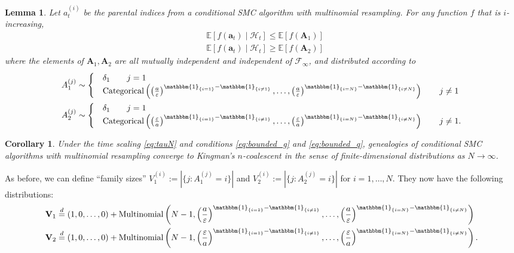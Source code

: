 \documentclass[fleqn]{article}
\newtheorem{lemma}{Lemma}
\newtheorem{corollary}{Corollary}
\theoremstyle{definition}
\newcommand{\E}{\mathbb{E}}
\newcommand{\eqdist}{\overset{d}{=}}
\newcommand{\1}[1]{\mathbbm{1}_{\{#1\}}}
\newcommand{\Cat}{\operatorname{Categorical}}
\newcommand{\Mn}{\operatorname{Multinomial}}
\begin{document}
\begin{lemma}\label{lem:i_increasing_csmc}
Let $a_t^{(i)}$ be the parental indices from a  conditional SMC algorithm with multinomial resampling. For any function $f$ that is $i$-increasing, 
\begin{align*}
& \E[f(\mathbf{a}_t) \mid \mathcal{H}_t] \leq \E[f(\mathbf{A}_1)] \\
& \E[f(\mathbf{a}_t) \mid \mathcal{H}_t] \geq \E[f(\mathbf{A}_2)]
\end{align*}
where the elements of $\mathbf{A}_1, \mathbf{A}_2$ are all mutually independent and independent of $\mathcal{F}_{\infty}$, and distributed according to
\begin{align*}
& A_1^{(j)} \sim \begin{cases}
& \delta_1  \qquad j=1\\
& \Cat\left( \left( \frac{a}{\varepsilon} \right)^{\1{i=1} -\1{i\neq 1}} ,\dots, \left( \frac{a}{\varepsilon} \right)^{\1{i=N} -\1{i\neq N}} \right) \qquad j\neq 1
 \end{cases}\\
& A_2^{(j)} \sim \begin{cases}
& \delta_1 \qquad j=1 \\
& \Cat\left( \left( \frac{\varepsilon}{a} \right)^{\1{i=1} -\1{i\neq 1}} ,\dots, \left( \frac{\varepsilon}{a} \right)^{\1{i=N} -\1{i\neq N}} \right) \qquad j\neq 1 .
\end{cases}
\end{align*}
\end{lemma}

\begin{corollary}\label{thm:csmc_newassns}
Under the time scaling \eqref{eq:tauN} and conditions \eqref{eq:bounded_g} and \eqref{eq:bounded_q}, genealogies of conditional SMC algorithms with multinomial resampling converge to Kingman's $n$-coalescent in the sense of finite-dimensional distributions as $N\to\infty$.
\end{corollary}

As before, we can define ``family sizes'' $V_1^{(i)} := |\{j: A_1^{(j)}=i\}|$ and $V_2^{(i)} := |\{j: A_2^{(j)}=i\}|$ for $i=1,\dots,N$. They now have the following distributions:
\begin{align*}
& \mathbf{V}_1 \eqdist (1,0,\dots,0) + \Mn\left(N-1, \left( \frac{a}{\varepsilon} \right)^{\1{i=1} -\1{i\neq 1}} ,\dots, \left( \frac{a}{\varepsilon} \right)^{\1{i=N} -\1{i\neq N}} \right) \\
& \mathbf{V}_2 \eqdist (1,0,\dots, 0) + \Mn\left(N-1, \left( \frac{\varepsilon}{a} \right)^{\1{i=1} -\1{i\neq 1}} ,\dots, \left( \frac{\varepsilon}{a} \right)^{\1{i=N} -\1{i\neq N}} \right) .
\end{align*}
\end{document}
